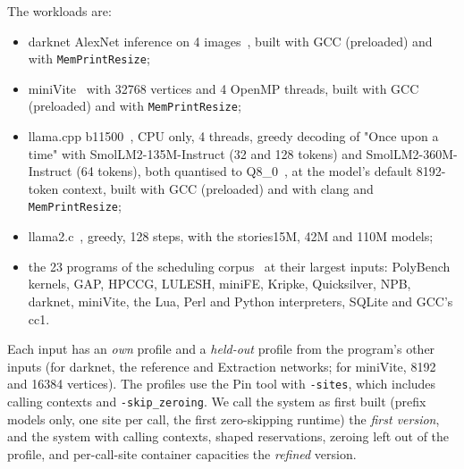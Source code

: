 \documentclass[11pt]{article}
\newcommand{\pass}{\texttt{MemPrintResize}}
\newcommand{\term}[1]{\emph{#1}}
\begin{document}
The workloads are:
\begin{itemize}
  \item darknet AlexNet inference on 4 images~\cite{darknet}, built with GCC (preloaded) and with \pass{};
  \item miniVite~\cite{minivite} with 32768 vertices and 4 OpenMP threads, built with GCC (preloaded) and with
  \pass{};
  \item llama.cpp b11500~\cite{llamacpp}, CPU only, 4 threads, greedy decoding of "Once upon a time" with
  SmolLM2-135M-Instruct (32 and 128 tokens) and SmolLM2-360M-Instruct (64 tokens), both quantised to
  Q8\_0~\cite{SmolLM2}, at the model's default 8192-token context, built with GCC (preloaded) and with clang and
  \pass{};
  \item llama2.c~\cite{llama2c}, greedy, 128 steps, with the stories15M, 42M and 110M models;
  \item the 23 programs of the scheduling corpus~\cite{memprintsched} at their largest inputs: PolyBench kernels,
  GAP, HPCCG, LULESH, miniFE, Kripke, Quicksilver, NPB, darknet, miniVite, the Lua, Perl and Python
  interpreters, SQLite and GCC's cc1.
\end{itemize}
Each input has an \term{own} profile and a \term{held-out} profile from the program's other inputs (for darknet,
the reference and Extraction networks; for miniVite, 8192 and 16384 vertices). The profiles use the Pin tool with
\texttt{-sites}, which includes calling contexts and \texttt{-skip\_zeroing}. We call the system as first built
(prefix models only, one site per call, the first zero-skipping runtime) the \term{first version}, and the system
with calling contexts, shaped reservations, zeroing left out of the profile, and per-call-site container
capacities the \term{refined} version.
\end{document}
